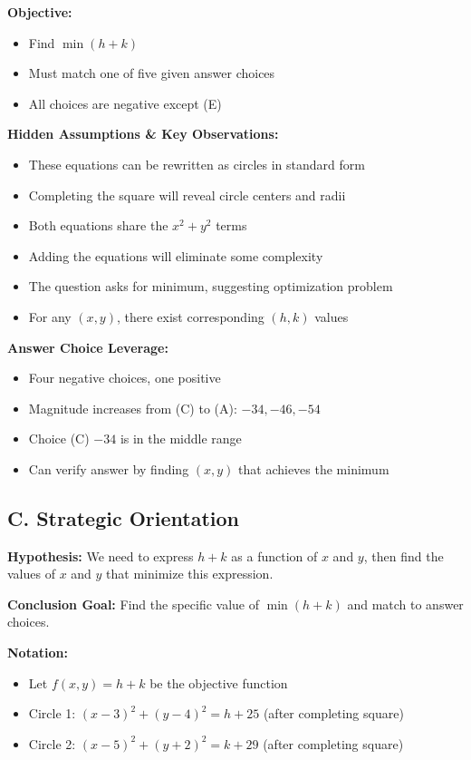 \documentclass[12pt]{article}
\begin{document}
\begin{problemconfigbox}
\textbf{Objective:}
\begin{itemize}
    \item Find $\min(h + k)$
    \item Must match one of five given answer choices
    \item All choices are negative except (E)
\end{itemize}

\textbf{Hidden Assumptions \& Key Observations:}
\begin{itemize}
    \item These equations can be rewritten as circles in standard form
    \item Completing the square will reveal circle centers and radii
    \item Both equations share the $x^2 + y^2$ terms
    \item Adding the equations will eliminate some complexity
    \item The question asks for minimum, suggesting optimization problem
    \item For any $(x, y)$, there exist corresponding $(h, k)$ values
\end{itemize}

\textbf{Answer Choice Leverage:}
\begin{itemize}
    \item Four negative choices, one positive
    \item Magnitude increases from (C) to (A): $-34, -46, -54$
    \item Choice (C) $-34$ is in the middle range
    \item Can verify answer by finding $(x, y)$ that achieves the minimum
\end{itemize}

\subsection*{C. Strategic Orientation}

\textbf{Hypothesis:} 
We need to express $h + k$ as a function of $x$ and $y$, then find the values of $x$ and $y$ that minimize this expression.

\textbf{Conclusion Goal:}
Find the specific value of $\min(h + k)$ and match to answer choices.

\textbf{Notation:}
\begin{itemize}
    \item Let $f(x, y) = h + k$ be the objective function
    \item Circle 1: $(x - 3)^2 + (y - 4)^2 = h + 25$ (after completing square)
    \item Circle 2: $(x - 5)^2 + (y + 2)^2 = k + 29$ (after completing square)
\end{itemize}


\end{problemconfigbox}
\end{document}
